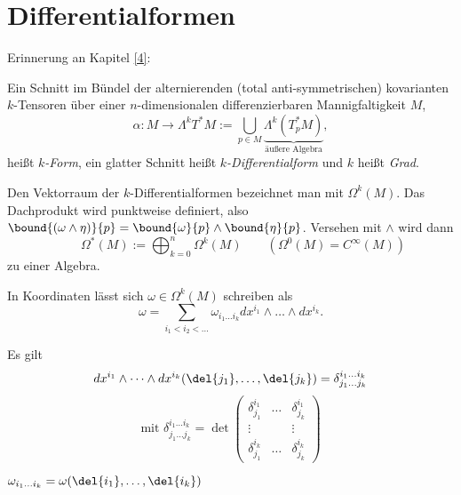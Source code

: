 \chapter{Differentialformen}\lecture

Erinnerung an Kapitel \ref{4}:

\begin{defn*}
	Ein Schnitt im Bündel der alternierenden (total anti-symmetrischen) kovarianten $k$-Tensoren über einer $n$-dimensionalen differenzierbaren Mannigfaltigkeit $M$,
	\[ \alpha: M \to \Lambda^k T^*M := \bigcup_{p \in M} \underbrace{\Lambda^k(T_p^*M)}_{\text{äußere Algebra}}, \]
	heißt \emph{$k$-Form}, ein glatter Schnitt heißt \emph{$k$-Differentialform} und $k$ heißt \emph{Grad}.
\end{defn*}

Den Vektorraum der $k$-Differentialformen bezeichnet man mit $\Omega^k(M)$. Das Dachprodukt wird punktweise definiert, also $ \bound{(\omega \wedge \eta)}{p} = \bound{\omega}{p} \wedge \bound{\eta}{p} $. Versehen mit $\wedge$ wird dann
	\[ \qquad \Omega^*(M) := \bigoplus_{k=0}^n \Omega^k(M) \qquad (\Omega^0(M) = C^\infty(M)) \]
zu einer Algebra.

\begin{rem*}
	In Koordinaten lässt sich $\omega \in \Omega^k(M)$ schreiben als
	\[ \omega = \sum_{i_1 < i_2 < \dots} \omega_{i_1\dots i_k} dx^{i_1} \wedge \dots \wedge dx^{i_k}. \]
\end{rem*}

\begin{lem}
	Es gilt
	\[ dx^{i_1} \wedge \dots \wedge dx^{i_k} (\del{j_1}, \dotsc, \del{j_k}) = \delta_{j_1\dots j_k}^{i_1 \dots i_k} \]
	\[ \text{mit } \delta_{j_1\dots j_k}^{i_1 \dots i_k} = \det \begin{pmatrix}
		\delta_{j_1}^{i_1} & \dots & \delta_{j_k}^{i_1}\\
		\vdots & & \vdots\\
		\delta_{j_1}^{i_k} & \dots & \delta_{j_k}^{i_k}
	\end{pmatrix} \]
\end{lem}

\begin{cor*}
	$ \omega_{i_1 \dots i_k} = \omega(\del{i_1}, \dotsc, \del{i_k}) $
\end{cor*}

